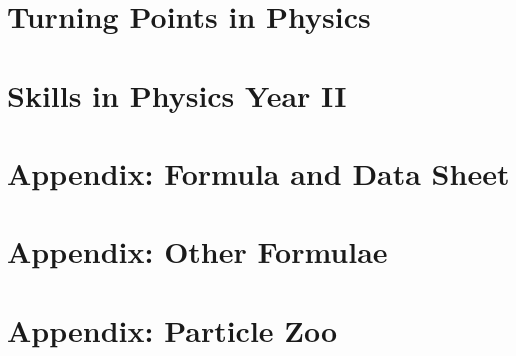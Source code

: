 \documentclass{book}
\newcommand{\comment}[1]{} %
\begin{document}
\comment{ %
\chapter{Astrophysics} \label{ch:astrophysics}
    

\chapter{Medical Physics} \label{ch:medical_physics}
    

\chapter{Engineering Physics} \label{ch:engineering_physics}
    
}

\chapter{Turning Points in Physics} \label{ch:turning_points_in_physics}
    

\comment{ %
\chapter{Electronics} \label{ch:electronics}
    
}

\chapter{Skills in Physics Year II} \label{ch:skills_in_physics_ii}
    

\appendix
\chapter{Appendix: Formula and Data Sheet} \label{formula_and_data_sheet}
    

\chapter{Appendix: Other Formulae} \label{other_formulae}
    

\chapter{Appendix: Particle Zoo} \label{particle_zoo}
    

\printnoidxglossaries

\newpage
\end{document}
